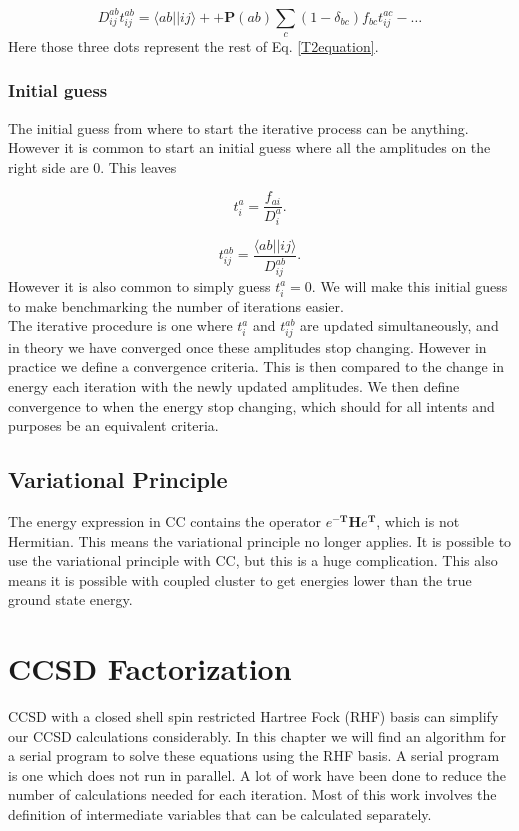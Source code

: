 \documentclass[a4paper,norsk,11pt,twoside]{report}
\begin{document}
\begin{equation}
D_{ij}^{ab} t_{ij}^{ab} = \langle ab||ij \rangle + + 
\textbf{P}(ab) \sum_c (1-\delta_{bc}) f_{bc} t_{ij}^{ac} - \dots \nonumber
\end{equation}
Here those three dots represent the rest of Eq. \eqref{T2equation}.

\subsection{Initial guess}
The initial guess from where to start the iterative process can be anything. However it is common to start an initial guess where all the amplitudes on the right side are 0. This leaves

\begin{equation}
t_i^a = \frac{f_{ai}}{D_i^a} .
\end{equation}

\begin{equation}
t_{ij}^{ab} = \frac{\langle ab || ij \rangle}{D_{ij}^{ab}} .
\end{equation}
However it is also common to simply guess $t_i^a = 0$. We will make this initial guess to make benchmarking the number of iterations easier. \\

The iterative procedure is one where $t_i^a$ and $t_{ij}^{ab}$ are updated simultaneously, and in theory we have converged once these amplitudes stop changing. However in practice we define a convergence criteria. This is then compared to the change in energy each iteration with the newly updated amplitudes. We then define convergence to when the energy stop changing, which should for all intents and purposes be an equivalent criteria. 

\section{Variational Principle}
The energy expression in CC contains the operator $e^{-\textbf{T}} \textbf{H} e^{\textbf{T}}$, which is not Hermitian. This means the variational principle no longer applies. It is possible to use the variational principle with CC, but this is a huge complication. This also means it is possible with coupled cluster to get energies lower than the true ground state energy.

\chapter{CCSD Factorization}
CCSD with a closed shell spin restricted Hartree Fock (RHF) basis can simplify our CCSD calculations considerably. In this chapter we will find an algorithm for a serial program to solve these equations using the RHF basis. A serial program is one which does not run in parallel. A lot of work have been done to reduce the number of calculations needed for each iteration. Most of this work involves the definition of intermediate variables that can be calculated separately. \\
\end{document}
